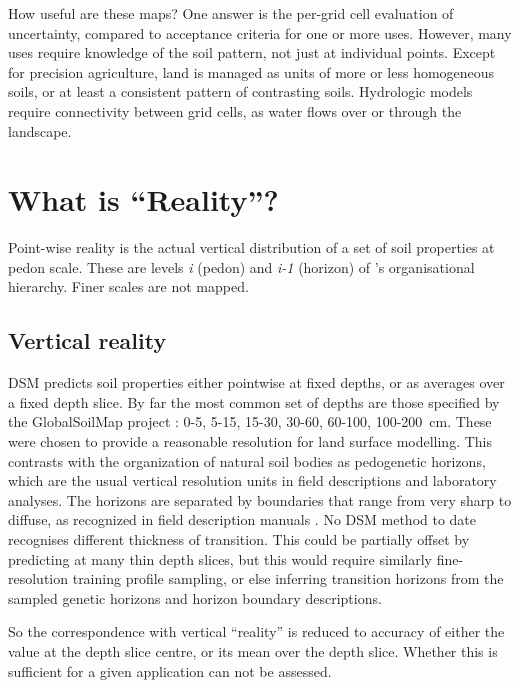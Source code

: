 \documentclass[soil, manuscript]{copernicus}
\begin{document}
\par
How useful are these maps? One answer is the per-grid cell evaluation of uncertainty, compared to acceptance criteria for one or more uses.
%
However, many uses require knowledge of the soil pattern, not just at individual points.
%
Except for precision agriculture, land is managed as units of more or less homogeneous soils, or at least a consistent pattern of contrasting soils.
%
Hydrologic models require connectivity between grid cells, as water flows over or through the landscape.

\section{What is ``Reality''?}

\par
Point-wise reality is the actual vertical distribution of a set of soil properties at pedon scale.
%
These are levels \textit{i} (pedon) and \textit{i-1} (horizon) of \citet{Hoosbeekquantitativemodelingpedogenesis1992}'s organisational hierarchy.
%
Finer scales are not mapped.

\subsection{Vertical reality}

DSM predicts soil properties either pointwise at fixed depths, or as averages over a fixed depth slice.
%
By far the most common set of depths are those specified by the GlobalSoilMap project \citep{ScienceCommittee2015a}: 0-5, 5-15, 15-30, 30-60, 60-100, 100-200~cm.
%
These were chosen to provide a reasonable resolution for land surface modelling.
%
This contrasts with the organization of natural soil bodies as pedogenetic horizons, which are the usual vertical resolution units in field descriptions and laboratory analyses.
%
The horizons are separated by boundaries that range from very sharp to diffuse, as recognized in field description manuals \citep{usdanaturalresourcesconservationservice.FieldBookDescribing2024, foodandagricultureorganizationoftheunitednationsGuidelinesSoilDescription2006}.
%
No DSM method to date recognises different thickness of transition.
%
This could be partially offset by predicting at many thin depth slices, but this would require similarly fine-resolution training profile sampling, or else inferring transition horizons from the sampled genetic horizons and horizon boundary descriptions.

\par
So the correspondence with vertical ``reality'' is reduced to accuracy of either the value at the depth slice centre, or its mean over the depth slice.
%
Whether this is sufficient for a given application can not be assessed.
\end{document}
